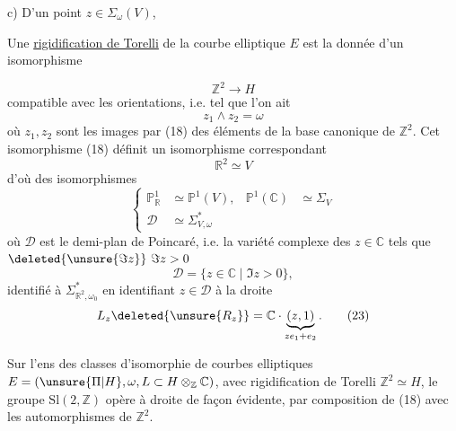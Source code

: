 c) D'un point $z\in\Sigma_\omega(V)$,

Une \uline{rigidification de Torelli} de la courbe elliptique $E$ est la donnée d'un isomorphisme

\begin{equation}
\mathbb Z^2\longrightarrow H
\tag{18}
\end{equation}
compatible avec les orientations, i.e. tel que l'on ait
\begin{equation}
z_1\wedge z_2=\omega
\tag{19}
\end{equation}
où $z_1,z_2$ sont les images par (18) des éléments de la base canonique de $\mathbb Z^2$. Cet isomorphisme (18) définit un isomorphisme correspondant
\begin{equation}
\mathbb R^2\simeq V
\tag{20}
\end{equation}
d'où des isomorphismes
\begin{equation}
\left\{
\begin{aligned}
\mathbb P_{\mathbb R}^1&\simeq\mathbb P^1(V),&
\mathbb P^1(\mathbb C)&\simeq\Sigma_V\\
\mathcal D&\simeq\Sigma_{V,\omega}^*
\end{aligned}
\right.
\tag{21}
\end{equation}
où $\mathcal D$ est le demi-plan de Poincaré, i.e.  la variété complexe des $z\in\mathbb C$ tels que $\deleted{\unsure{\Im z}}\ \Im z>0$
\begin{equation}
\mathcal D=\{z\in\mathbb C\mid\Im z>0\},
\tag{22}
\end{equation}
identifié à $\Sigma_{\mathbb R^2,\omega_0}^*$ en identifiant $z\in\mathcal D$ à la droite
\begin{equation}
L_z\deleted{\unsure{R_z}}=\mathbb C\cdot\underbrace{(z,1)}_{ze_1+e_2}.
\tag{23}
\end{equation}



Sur l'ens des classes d'isomorphie de courbes elliptiques $E=(\unsure{\Pi|H},\omega,L\subset H\otimes_{\mathbb Z}\mathbb C)$, avec rigidification de Torelli $\mathbb Z^2\simeq H$, le groupe $\mathrm{Sl}(2,\mathbb Z)$ opère à droite de façon évidente, par composition  de (18) avec les automorphismes de $\mathbb Z^2$. 

